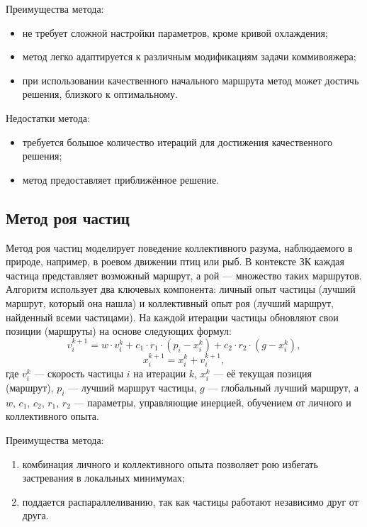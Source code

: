 Преимущества метода:
\begin{itemize}[label=---]
    \item не требует сложной настройки параметров, кроме кривой охлаждения;
    \item метод легко адаптируется к различным модификациям задачи коммивояжера;
    \item при использовании качественного начального маршрута метод может достичь решения, близкого к оптимальному.
\end{itemize}

Недостатки метода:
\begin{itemize}[label=---]
    \item требуется большое количество итераций для достижения качественного решения;
    \item метод предоставляет приближённое решение.
\end{itemize}

\subsection{Метод роя частиц}
Метод роя частиц моделирует поведение коллективного разума, наблюдаемого в природе, например, в роевом движении птиц или рыб. В контексте ЗК каждая частица представляет возможный маршрут, а рой — множество таких маршрутов. Алгоритм использует два ключевых компонента: личный опыт частицы (лучший маршрут, который она нашла) и коллективный опыт роя (лучший маршрут, найденный всеми частицами). На каждой итерации частицы обновляют свои позиции (маршруты) на основе следующих формул:
\begin{equation}
v_i^{k+1} = w \cdot v_i^k + c_1 \cdot r_1 \cdot (p_i - x_i^k) + c_2 \cdot r_2 \cdot (g - x_i^k),
\end{equation}
\begin{equation}
x_i^{k+1} = x_i^k + v_i^{k+1},
\end{equation}
где \(v_i^k\) — скорость частицы \(i\) на итерации \(k\), \(x_i^k\) — её текущая позиция (маршрут), \(p_i\) — лучший маршрут частицы, \(g\) — глобальный лучший маршрут, а \(w\), \(c_1\), \(c_2\), \(r_1\), \(r_2\) — параметры, управляющие инерцией, обучением от личного и коллективного опыта.

Преимущества метода:
\begin{enumerate}
    \item комбинация личного и коллективного опыта позволяет рою избегать застревания в локальных минимумах;
    \item поддается распараллеливанию, так как частицы работают независимо друг от друга.
\end{enumerate}

